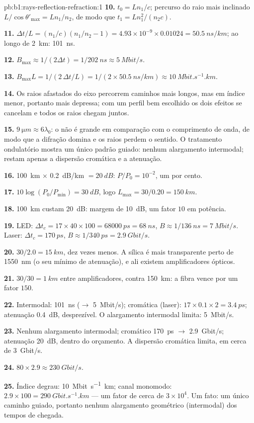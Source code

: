 \begin{solution}{pb:b1:rays-reflection-refraction:1}
\textbf{10.} $t_0 = Ln_1/c$; percurso do raio mais inclinado $L/\cos\theta'_{\max} =
Ln_1/n_2$, de modo que $t_1 = Ln_1^2/(n_2 c)$.

\textbf{11.} $\Delta t/L = (n_1/c)(n_1/n_2 - 1) = 4.93\times10^{-9} \times
0.01024 = \qty{50.5}{ns/km}$; ao longo de \qty{2}{km}: \qty{101}{ns}.

\textbf{12.} $B_{\max} \approx 1/(2\Delta t) = 1/\qty{202}{ns} \approx
\qty{5}{Mbit/s}$.

\textbf{13.} $B_{\max} L = 1/(2\,\Delta t/L) = 1/(2 \times
\qty{50.5}{ns/km}) \approx \qty{10}{Mbit.s^{-1}.km}$.

\textbf{14.} Os raios afastados do eixo percorrem caminhos mais longos, mas em
índice menor, portanto mais depressa; com um perfil bem escolhido os dois efeitos se cancelam
e todos os raios chegam juntos.

\textbf{15.} $\qty{9}{\micro m} \approx 6\lambda_0$: o  não é
grande em comparação com o comprimento de onda, de modo que a difração domina e os raios
perdem o sentido. O tratamento ondulatório mostra um único padrão guiado: nenhum
alargamento intermodal; restam apenas a dispersão cromática e a atenuação.

\textbf{16.} \qty{100}{km} $\times$ \qty{0.2}{dB/km} $= \qty{20}{dB}$:
$P/P_0 = 10^{-2}$, um por cento.

\textbf{17.} $10\log(P_0/P_{\min}) = \qty{30}{dB}$, logo $L_{\max} =
30/0.20 = \qty{150}{km}$.

\textbf{18.} \qty{100}{km} custam \qty{20}{dB}: margem de \qty{10}{dB}, um
fator $10$ em potência.

\textbf{19.} LED: $\Delta t_c = 17 \times 40 \times 100 = \qty{68000}{ps}
= \qty{68}{ns}$, $B \approx 1/\qty{136}{ns} = \qty{7}{Mbit/s}$. Laser:
$\Delta t_c = \qty{170}{ps}$, $B \approx 1/\qty{340}{ps} =
\qty{2.9}{Gbit/s}$.

\textbf{20.} $30/2.0 = \qty{15}{km}$, dez vezes menos. A sílica é mais
transparente perto de \qty{1550}{nm} (o seu mínimo de atenuação), e ali existem
amplificadores ópticos.

\textbf{21.} $30/30 = \qty{1}{km}$ entre amplificadores, contra
\qty{150}{km}: a fibra vence por um fator $150$.

\textbf{22.} Intermodal: \qty{101}{ns} ($\to$ \qty{5}{Mbit/s});
cromática (laser): $17 \times 0.1 \times 2 = \qty{3.4}{ps}$;
atenuação \qty{0.4}{dB}, desprezível. O alargamento intermodal limita:
\qty{5}{Mbit/s}.

\textbf{23.} Nenhum alargamento intermodal; cromático \qty{170}{ps} $\to$
\qty{2.9}{Gbit/s}; atenuação \qty{20}{dB}, dentro do orçamento. A dispersão
cromática limita, em cerca de \qty{3}{Gbit/s}.

\textbf{24.} $80 \times 2.9 \approx \qty{230}{Gbit/s}$.

\textbf{25.} Índice degrau: \qty{10}{Mbit.s^{-1}.km}; canal monomodo:
$2.9 \times 100 = \qty{290}{Gbit.s^{-1}.km}$ --- um fator de cerca de
$3\times10^4$. Um fato: um único caminho guiado, portanto nenhum alargamento
geométrico (intermodal) dos tempos de chegada.
\end{solution}
